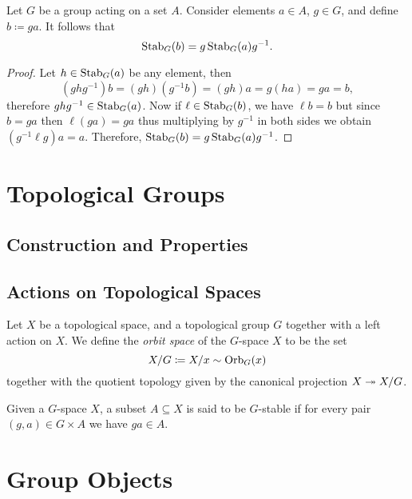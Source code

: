 \begin{theorem}
\label{thm:stabilizers-conjugation}
Let \(G\) be a group acting on a set \(A\). Consider elements \(a \in A\),
\(g \in G\), and define \(b \coloneq g a\). It follows that
\[
\operatorname{Stab}_G(b) = g \operatorname{Stab}_G(a) g^{-1}.
\]
\end{theorem}

\begin{proof}
Let \(h \in \operatorname{Stab}_G(a)\) be any element, then
\[
(g h g^{-1}) b = (g h) (g^{-1} b) = (g h) a = g (h a) = g a = b,
\]
therefore \(g h g^{-1} \in \operatorname{Stab}_G(a)\). Now if \(\ell \in \operatorname{Stab}_G(b)\), we have
\(\ell b = b\) but since \(b = g a\) then \(\ell (g a) = g a\) thus multiplying
by \(g^{-1}\) in both sides we obtain \((g^{-1} \ell g) a = a\). Therefore,
\(\operatorname{Stab}_G(b) = g \operatorname{Stab}_G(a) g^{-1}\).
\end{proof}

\section{Topological Groups}

\subsection{Construction and Properties}


\subsection{Actions on Topological Spaces}

\begin{definition}
\label{def:orbit-space}
Let \(X\) be a topological space, and a topological group \(G\) together with a
left action on \(X\). We define the \emph{orbit space} of the \(G\)-space \(X\)
to be the set
\[
X/G \coloneq X/{x \sim \operatorname{Orb}_G(x)}
\]
together with the quotient topology given by the canonical projection
\(X \twoheadrightarrow X/G\).
\end{definition}

\begin{definition}[\(G\)-stable]
\label{def:G-stable}
Given a \(G\)-space \(X\), a subset \(A \subseteq X\) is said to be \(G\)-stable
if for every pair \((g, a) \in G \times A\) we have \(g a \in A\).
\end{definition}

\section{Group Objects}

